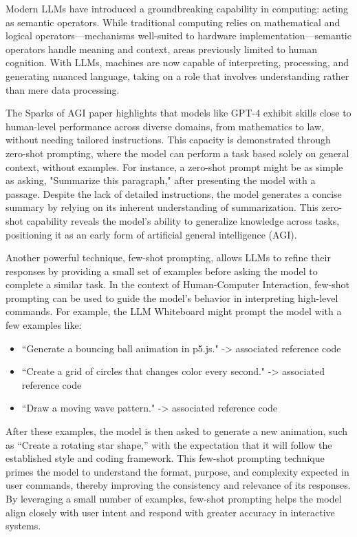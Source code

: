 Modern LLMs have introduced a groundbreaking capability in computing: acting as semantic operators.
While traditional computing relies on mathematical and logical operators—mechanisms well-suited to hardware implementation—semantic operators handle meaning and context, areas previously limited to human cognition.
With LLMs, machines are now capable of interpreting, processing, and generating nuanced language, taking on a role that involves understanding rather than mere data processing.

The Sparks of AGI paper\cite{bubeck2023sparks} highlights that models like GPT-4 exhibit skills close to human-level performance across diverse domains, from mathematics to law, without needing tailored instructions.
This capacity is demonstrated through zero-shot prompting\cite{li2023practical}, where the model can perform a task based solely on general context, without examples.
For instance, a zero-shot prompt might be as simple as asking, "Summarize this paragraph," after presenting the model with a passage.
Despite the lack of detailed instructions, the model generates a concise summary by relying on its inherent understanding of summarization.
This zero-shot capability reveals the model’s ability to generalize knowledge across tasks, positioning it as an early form of artificial general intelligence (AGI).

Another powerful technique, few-shot prompting\cite{brown2020language}, allows LLMs to refine their responses by providing a small set of examples before asking the model to complete a similar task.
In the context of Human-Computer Interaction, few-shot prompting can be used to guide the model’s behavior in interpreting high-level commands.
For example, the LLM Whiteboard might prompt the model with a few examples like:

\begin{itemize}
    \item “Generate a bouncing ball animation in p5.js." -> associated reference code
    \item “Create a grid of circles that changes color every second." -> associated reference code
    \item “Draw a moving wave pattern." -> associated reference code
\end{itemize}

After these examples, the model is then asked to generate a new animation, such as “Create a rotating star shape,” with the expectation that it will follow the established style and coding framework.
This few-shot prompting technique primes the model to understand the format, purpose, and complexity expected in user commands, thereby improving the consistency and relevance of its responses.
By leveraging a small number of examples, few-shot prompting helps the model align closely with user intent and respond with greater accuracy in interactive systems.

